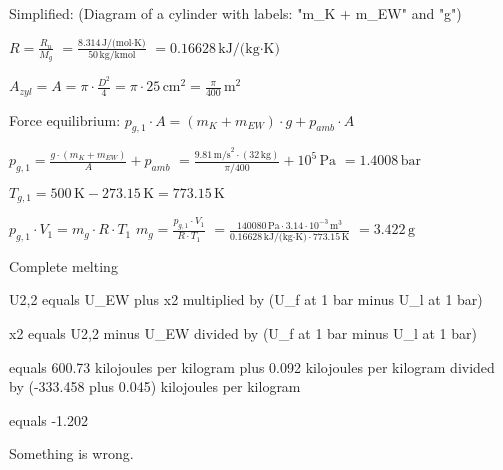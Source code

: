 Simplified:  
(Diagram of a cylinder with labels: "m_K + m_EW" and "g")  

\( R = \frac{R_u}{M_g} \)  
\( = \frac{8.314 \, \text{J/(mol·K)}}{50 \, \text{kg/kmol}} \)  
\( = 0.16628 \, \text{kJ/(kg·K)} \)  

\( A_{zyl} = A = \pi \cdot \frac{D^2}{4} = \pi \cdot 25 \, \text{cm}^2 = \frac{\pi}{400} \, \text{m}^2 \)  

Force equilibrium:  
\( p_{g,1} \cdot A = (m_K + m_{EW}) \cdot g + p_{amb} \cdot A \)  

\( p_{g,1} = \frac{g \cdot (m_K + m_{EW})}{A} + p_{amb} \)  
\( = \frac{9.81 \, \text{m/s}^2 \cdot (32 \, \text{kg})}{\pi / 400} + 10^5 \, \text{Pa} \)  
\( = 1.4008 \, \text{bar} \)  

\( T_{g,1} = 500 \, \text{K} - 273.15 \, \text{K} = 773.15 \, \text{K} \)  

\( p_{g,1} \cdot V_1 = m_g \cdot R \cdot T_1 \)  
\( m_g = \frac{p_{g,1} \cdot V_1}{R \cdot T_1} \)  
\( = \frac{140080 \, \text{Pa} \cdot 3.14 \cdot 10^{-3} \, \text{m}^3}{0.16628 \, \text{kJ/(kg·K)} \cdot 773.15 \, \text{K}} \)  
\( = 3.422 \, \text{g} \)

Complete melting  

U2,2 equals U_EW plus x2 multiplied by (U_f at 1 bar minus U_l at 1 bar)  

x2 equals U2,2 minus U_EW divided by (U_f at 1 bar minus U_l at 1 bar)  

equals 600.73 kilojoules per kilogram plus 0.092 kilojoules per kilogram divided by (-333.458 plus 0.045) kilojoules per kilogram  

equals -1.202  

Something is wrong.